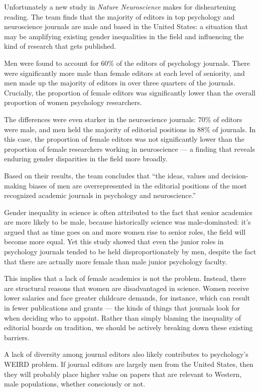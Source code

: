 \documentclass[UTF8,11pt]{ctexart}
\begin{document}
Unfortunately a new study in \textit{Nature Neuroscience} makes for disheartening reading. The team finds that the majority of editors in top psychology and neuroscience journals are male and based in the United States: a situation that may be amplifying existing gender inequalities in the field and influencing the kind of research that gets published.


Men were found to account for 60\% of the editors of psychology journals. There were significantly more male than female editors at each level of seniority, and men made up the majority of editors in over three quarters of the journals. Crucially, the proportion of female editors was significantly lower than the overall proportion of women psychology researchers.


The differences were even starker in the neuroscience journals: 70\% of editors were male, and men held the majority of editorial positions in 88\% of journals. In this case, the proportion of female editors was not significantly lower than the proportion of female researchers working in neuroscience — a finding that reveals enduring gender disparities in the field more broadly.


Based on their results, the team concludes that “the ideas, values and decision-making biases of men are overrepresented in the editorial positions of the most recognized academic journals in psychology and neuroscience.”


Gender inequality in science is often attributed to the fact that senior academics are more likely to be male, because historically science was male-dominated: it’s argued that as time goes on and more women rise to senior roles, the field will become more equal. Yet this study showed that even the junior roles in psychology journals tended to be held disproportionately by men, despite the fact that there are actually more female than male junior psychology faculty.


This implies that a lack of female academics is not the problem. Instead, there are structural reasons that women are disadvantaged in science. Women receive lower salaries and face greater childcare demands, for instance, which can result in fewer publications and grants — the kinds of things that journals look for when deciding who to appoint. Rather than simply blaming the inequality of editorial boards on tradition, we should be actively breaking down these existing barriers.


A lack of diversity among journal editors also likely contributes to psychology’s WEIRD problem. If journal editors are largely men from the United States, then they will probably place higher value on papers that are relevant to Western, male populations, whether consciously or not.
\end{document}
